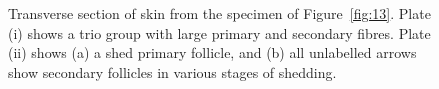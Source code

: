 %

\begin{figure}[h]
  \centering
  \caption{ Transverse section of skin from the specimen of 
	 Figure~\ref{fig:13}.  Plate
         (i) shows a trio group with large primary and secondary fibres.
	  Plate (ii) shows (a) a shed primary follicle, and (b) all
          unlabelled arrows show secondary follicles in various stages of
	  shedding. }
  \label{fig:14}
\end{figure}

%
